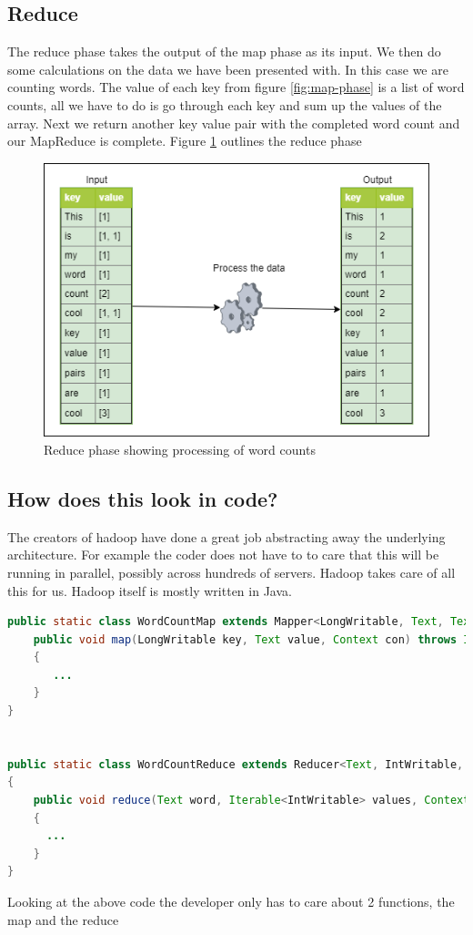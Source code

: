 \subsection{Reduce}

The reduce phase takes the output of the map phase as its input. We then do some calculations on the data we have been presented with. In this case we are counting words. The value of each key from figure \ref{fig:map-phase} is a list of word counts, all we have to do is go through each key and sum up the values of the array. Next we return another key value pair with the completed word count and our MapReduce is complete. Figure \ref{fig:reduce-phase} outlines the reduce phase

\begin{figure}[H]
  \includegraphics[width=\linewidth]{./images/reduce-phase.png}
  \caption{Reduce phase showing processing of word counts}
  \label{fig:reduce-phase}
\end{figure}

\subsection{How does this look in code?}

The creators of hadoop have done a great job abstracting away the underlying architecture. For example the coder does not have to to care that this will be running in parallel, possibly across hundreds of servers. Hadoop takes care of all this for us. 
Hadoop itself is mostly written in Java. 

\begin{lstlisting}[language=Java]
public static class WordCountMap extends Mapper<LongWritable, Text, Text, IntWritable>{
    public void map(LongWritable key, Text value, Context con) throws IOException,     InterruptedException
    {
       ...
    }
}


public static class WordCountReduce extends Reducer<Text, IntWritable, Text, IntWritable>
{
    public void reduce(Text word, Iterable<IntWritable> values, Context con) throws  IOException, InterruptedException
    {
      ...
    }
}

\end{lstlisting}

Looking at the above code the developer only has to care about 2 functions, the map and the reduce